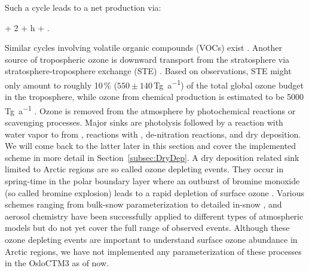 \documentclass[gmd, manuscript]{copernicus}
\begin{document}
Such a cycle leads to a net production via:
\begin{reaction}
   + 2 + h\nu \rightarrow {} + .
\end{reaction}
Similar cycles involving volatile organic compounds (VOCs) exist \citep{ACP:Monks2015}. Another source of tropospheric ozone is downward transport from the stratosphere via stratosphere-troposphere exchange (STE) \citep{WMO2014}. Based on observations, STE might only amount to roughly 10\,\unit{\%} ($550 \pm 140$\,\unit{Tg a^{-1}}) of the total global ozone budget in the troposphere, while ozone from chemical production is estimated to be 5000\,\unit{Tg a^{-1}} \citep{ACP:Monks2015}. Ozone is removed from the atmosphere by photochemical reactions or scavenging processes. Major sinks are photolysis followed by a reaction with water vapor to from ,
reactions with  \citep{ACP:Seinfeld2006},
de-nitration reactions,
and dry deposition. We will come back to the latter later in this section and cover the implemented scheme in more detail in Section~\ref{subsec:DryDep}. A dry deposition related sink limited to Arctic regions are so called ozone depleting events. They occur in spring-time in the polar boundary layer where an outburst of bromine monoxide  (so called bromine explosion) leads to a rapid depletion of surface ozone \citep{JGR:Oltmans1981,GRL:Bottenheim1986,Nat:Barrie1988,JGR:Bottenheim2006}. Various schemes ranging from bulk-snow parameterization \citep{ACP:Toyota2011,GMD:Falk2018} to detailed in-snow \citep{ACP:Toyota2014a}, and aerosol chemistry \citep{ACP:Yang2010} have been successfully applied to different types of atmospheric models but do not yet cover the full range of observed events. Although these ozone depleting events are important to understand surface ozone abundance in Arctic regions, we have not implemented any parameterization of these processes in the OsloCTM3 as of now.\\
\end{document}
